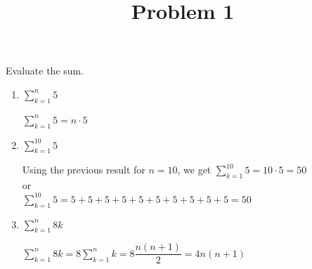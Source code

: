 \documentclass{ximera}
\title[Problem 1]{Problem 1}
\begin{document}
\begin{abstract} \end{abstract}
\maketitle


\begin{problem} Evaluate the sum.
\begin{enumerate}
	\item  $\displaystyle \sum_{k=1}^{n}5$
		\begin{explanation}
		  $\displaystyle \sum_{k=1}^{n}5=n\cdot5$
		\end{explanation}	
\item  $\displaystyle \sum_{k=1}^{10}5$
		\begin{explanation}
			Using the previous result for $n=10$, we get
 			$\displaystyle \sum_{k=1}^{10}5=10\cdot5=50$\\
  			or\\

   			$\displaystyle \sum_{k=1}^{10}5=5+5+5+5+5+5+5+5+5+5=50$
		\end{explanation}	
\item  $\displaystyle \sum_{k=1}^{n}8k$
		\begin{explanation}
  			$\displaystyle \sum_{k=1}^{n}8k=8\displaystyle \sum_{k=1}^{n}k=8\dfrac{n(n+1)}{2}=4n(n+1)$
		\end{explanation}	


\end{enumerate}
\end{problem}
\end{document}
